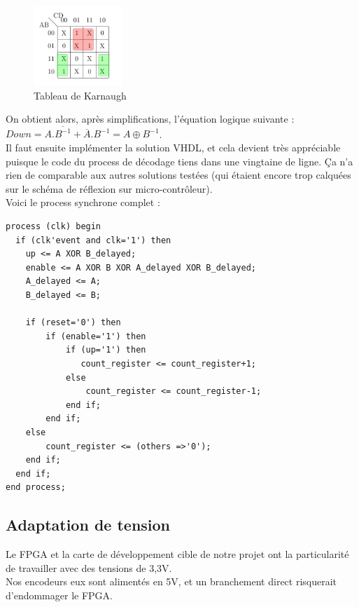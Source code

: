 	\begin{figure}[h!]
  		\centering
  		\includegraphics[width=0.3\textwidth]{img/Karnaugh}
 		\caption{Tableau de Karnaugh}
  		\label{img:Karnaugh}
	\end{figure}	

On obtient alors, après simplifications, l'équation logique suivante : $Down = A.\overline{B^{-1}} + \overline{A}.B^{-1} = A \oplus B^{-1}$.\\

Il faut ensuite implémenter la solution VHDL, et cela devient très appréciable puisque le code du process de décodage tiens dans une vingtaine de ligne. Ça n'a rien de comparable aux autres solutions testées (qui étaient encore trop calquées sur le schéma de réflexion sur micro-contrôleur).\\

\newpage
Voici le process synchrone complet : \\
\begin{lstlisting}
process (clk) begin
  if (clk'event and clk='1') then
    up <= A XOR B_delayed;
    enable <= A XOR B XOR A_delayed XOR B_delayed;
    A_delayed <= A;
    B_delayed <= B;

    if (reset='0') then
        if (enable='1') then
            if (up='1') then
               count_register <= count_register+1;
            else
                count_register <= count_register-1;
            end if;
        end if;
    else
        count_register <= (others =>'0');
    end if;
  end if;
end process;
\end{lstlisting}

	\newpage
	\subsection{Adaptation de tension}
	Le FPGA et la carte de développement cible de notre projet ont la particularité de travailler avec des tensions de 3,3V.\\
	Nos encodeurs eux sont alimentés en 5V, et un branchement direct risquerait d'endommager le FPGA.\\
	
